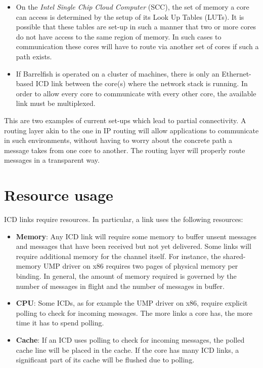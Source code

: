 \documentclass[a4paper,twoside]{report} %
\begin{document}
\begin{itemize}

\item On the \emph{Intel Single Chip Cloud Computer} (SCC), the set of memory a core can access is determined by the setup of its Look Up Tables (LUTs). It is possible that these tables are set-up in such a manner that
two or more cores do not have access to the same region of memory. In such cases to communication these cores will have to route via another set of cores if such a path exists.

\item If Barrelfish is operated on a cluster of machines, there is only an Ethernet-based ICD link between the core(s) where the network stack is running. In order to allow every core to communicate with every other core, the available link must be multiplexed. 

\end{itemize}

This are two examples of current set-ups which lead to partial connectivity. A routing layer akin to the one in IP routing will allow applications to communicate in
such environments, without having to worry about the concrete path a message takes from one core to another. The routing layer will properly route messages in a transparent way.

\section{Resource usage}
ICD links require resources. In particular, a link uses the following resources:

\begin{itemize}
\item \textbf{Memory}: Any ICD link will require some memory to buffer unsent messages and messages that have been received but not yet delivered. Some links will require additional memory for the channel itself. For instance, the shared-memory UMP driver on x86 requires two pages of physical memory per binding. In general, the amount of memory required is governed by the number of messages in flight and
the number of messages in buffer.

\item \textbf{CPU}: Some ICDs, as for example the UMP driver on x86, require explicit polling to check for incoming messages. The more links a core has, the more time it has to spend polling.

\item \textbf{Cache}: If an ICD  uses polling to check for incoming messages, the polled cache line will be placed in the cache. If the core has many ICD links, a significant part of its cache will be flushed due to polling.

\end{itemize}
\end{document}
